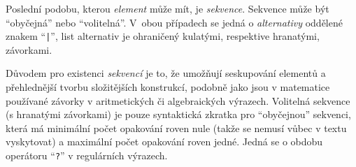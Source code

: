 Poslední podobu, kterou \emph{element} může mít, je \emph{sekvence}.
Sekvence může být \enquote{obyčejná} nebo \enquote{volitelná}.
V~obou případech se jedná o \emph{alternativy} oddělené znakem \enquote{\texttt{|}},
list alternativ je ohraničený kulatými, respektive hranatými, závorkami.

Důvodem pro existenci \emph{sekvencí} je to, že umožňují seskupování elementů a přehlednější tvorbu složitějších konstrukcí,
podobně jako jsou v matematice používané závorky v aritmetických či algebraických výrazech.
Volitelná sekvence (s hranatými závorkami) je pouze syntaktická zkratka pro \enquote{obyčejnou} sekvenci,
která má minimální počet opakování roven nule (takže se nemusí vůbec v textu vyskytovat) a
maximální počet opakování roven jedné.
Jedná se o obdobu operátoru \enquote{\texttt{?}} v regulárních výrazech.

